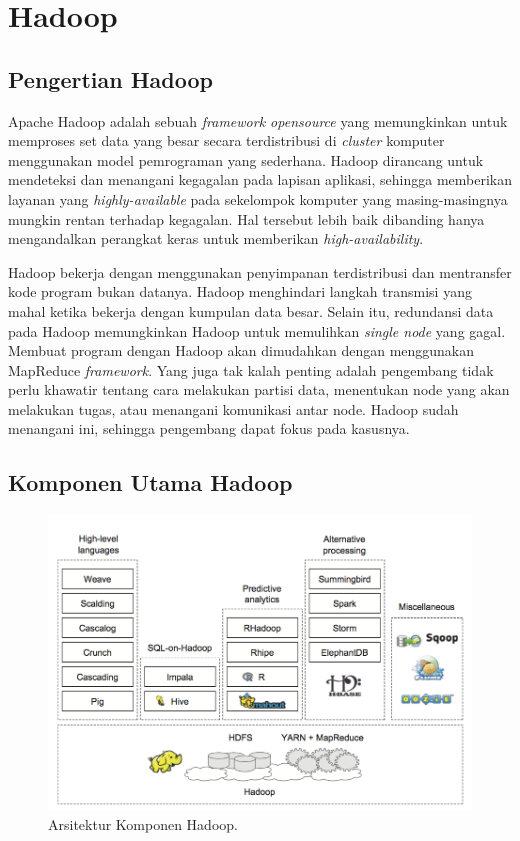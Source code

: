 \section{Hadoop}
\label{sec:hadoop}

\subsection{Pengertian Hadoop}
\label{sec:pengertian_hadoop}
Apache Hadoop adalah sebuah \textit{framework opensource} yang memungkinkan untuk memproses set data yang besar secara terdistribusi di \textit{cluster} komputer menggunakan model pemrograman yang sederhana. Hadoop dirancang untuk mendeteksi dan menangani kegagalan pada lapisan aplikasi, sehingga memberikan layanan yang \textit{highly-available} pada sekelompok komputer yang masing-masingnya mungkin rentan terhadap kegagalan. Hal tersebut lebih baik dibanding hanya mengandalkan perangkat keras untuk memberikan \textit{high-availability}.

Hadoop bekerja dengan menggunakan penyimpanan terdistribusi dan mentransfer kode program bukan datanya. Hadoop menghindari langkah transmisi yang mahal ketika bekerja dengan kumpulan data besar. Selain itu, redundansi data pada Hadoop memungkinkan Hadoop untuk memulihkan \textit{single node} yang gagal. Membuat program dengan Hadoop akan dimudahkan dengan menggunakan MapReduce \textit{framework}. Yang juga tak kalah penting adalah pengembang tidak perlu khawatir tentang cara melakukan partisi data, menentukan node yang akan melakukan tugas, atau menangani komunikasi antar node. Hadoop sudah menangani ini, sehingga pengembang dapat fokus pada kasusnya.

\subsection{Komponen Utama Hadoop}
\label{sec:komponen_utama_hadoop}
\begin{figure}
	\centering
	\includegraphics[scale=0.5]{Gambar/hadoop-architecture.png}
	\caption[Arsitektur Komponen Hadoop]{Arsitektur Komponen Hadoop.\cite{holmes2012hadoop}} 
	\label{fig:komponen_utama_hadoop}
\end{figure}

